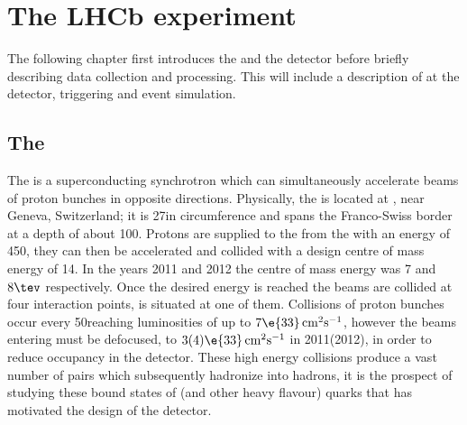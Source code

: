 \chapter{The LHCb experiment}
\label{ch:lhcb}

The following chapter first introduces the \lhc and the \lhcb detector before briefly
describing data collection and processing.
This will include a description of \pid at the \lhcb detector, triggering and event simulation.



\section{The \lhc}
The \lhc is a superconducting synchrotron which can simultaneously accelerate beams of proton bunches
in opposite directions.
Physically, the \lhc is located at \cern, near Geneva, Switzerland; it is 27\km in
circumference and spans the Franco-Swiss border at a depth of about 100\m.
Protons are supplied to the \lhc from the \sps with an energy of 450\gev, they can then
be accelerated and collided with a design centre of mass energy of 14\tev.
In the years 2011 and 2012 the centre of mass energy was 7 and $8\tev$ respectively.
Once the desired energy is reached the beams are collided at four interaction points, \lhcb is
situated at one of them.
Collisions of proton bunches occur every 50\ns reaching luminosities of up to
$7\e{33}\,\mathrm{cm}^{2}\mathrm{s}^{-1}$, however the beams entering \lhcb must be defocused, to
$3(4)\e{33}\,\mathrm{cm}^{2}\mathrm{s}^{-1}$ in 2011(2012), in order to reduce occupancy in the
\lhcb detector.
These high energy collisions produce a vast number of \bbbar pairs which subsequently hadronize
into \bquark hadrons, it is the prospect of studying these bound states of \bquark (and other heavy
flavour) quarks that has motivated the design of the \lhcb detector.







